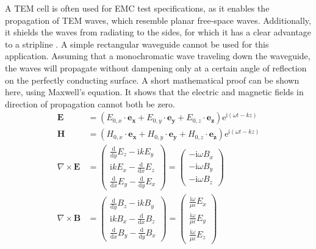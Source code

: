 A TEM cell is often used for EMC test specifications, as it enables the propagation of TEM waves, which resemble planar free-space waves. Additionally, it shields the waves from radiating to the sides, for which it has a clear advantage to a stripline \cite{809846,990711}. A simple rectangular waveguide cannot be used for this application. Assuming that a monochromatic wave traveling down the waveguide, the waves will propagate without dampening only at a certain angle of reflection on the perfectly conducting surface. A short mathematical proof can be shown here, using Maxwell's equation. It shows that the electric and magnetic fields in direction of propagation cannot both be zero. %
\begin{align}
    \mathbf{E}&=(E_{0,x}\cdot\mathbf{e_x}+E_{0,y}\cdot\mathbf{e_y}+E_{0,z}\cdot\mathbf{e_z})\mathrm{e}^{\mathrm{i}(\omega t-kz)}\\
    \mathbf{H}&=(H_{0,x}\cdot\mathbf{e_x}+H_{0,y}\cdot\mathbf{e_y}+H_{0,z}\cdot\mathbf{e_z})\mathrm{e}^{\mathrm{i}(\omega t-kz)}\\
    \nabla \times \mathbf{E} &=\begin{pmatrix}\frac{\mathrm{d}}{\mathrm{d}y}E_z-\mathrm{i}kE_y \\\mathrm{i}kE_x-\frac{\mathrm{d}}{\mathrm{d}x}E_z \\\frac{\mathrm{d}}{\mathrm{d}x}E_y-\frac{\mathrm{d}}{\mathrm{d}y}E_x\end{pmatrix}=\begin{pmatrix} -\mathrm{i}\omega B_x\\-\mathrm{i}\omega B_y\\ -\mathrm{i}\omega B_z \end{pmatrix}\\
    \nabla \times \mathbf{B} &=\begin{pmatrix}\frac{\mathrm{d}}{\mathrm{d}y}B_z-\mathrm{i}kB_y \\\mathrm{i}kB_x-\frac{\mathrm{d}}{\mathrm{d}x}B_z \\\frac{\mathrm{d}}{\mathrm{d}x}B_y-\frac{\mathrm{d}}{\mathrm{d}y}B_x\end{pmatrix}=\begin{pmatrix} \frac{\mathrm{i}\omega}{\mu\epsilon} E_x\\\frac{\mathrm{i}\omega}{\mu\epsilon} E_y\\ \frac{\mathrm{i}\omega}{\mu\epsilon} E_z \end{pmatrix}
\end{align}

